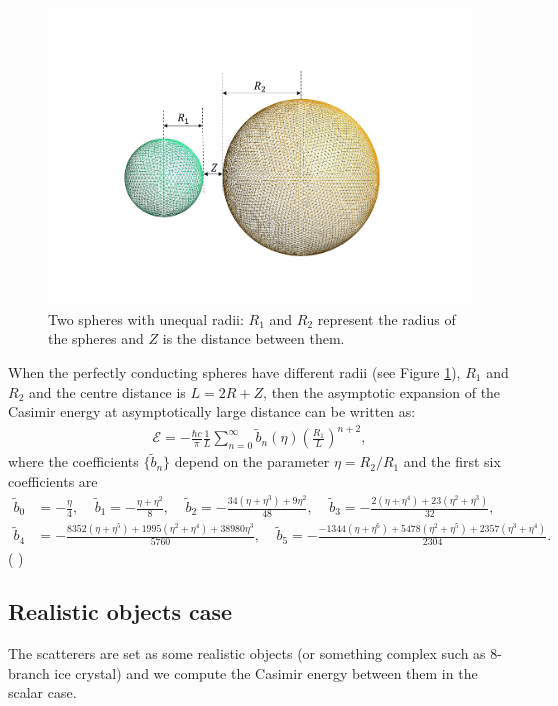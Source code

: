 \begin{figure}[H]
    \hspace*{2cm}\includegraphics[scale = 0.6]{figures/Grid_two_spheres_unequal_radii.png}
    \caption{Two spheres with unequal radii: $R_{1}$ and $R_{2}$ represent the radius of the spheres and $Z$ is the distance between them.}
    \label{Two spheres with unequal radii}
\end{figure}

When the perfectly conducting spheres have different radii (see Figure \ref{Two spheres with unequal radii}), $R_{1}$ and $R_{2}$ and the centre distance 
is $L = 2R+Z$, then the asymptotic expansion of the Casimir energy at asymptotically large distance can be written as:
\begin{align}\label{Asymptotic unequal radii}
    \mathcal{E} = -\frac{\hbar c}{\pi}\frac{1}{L}\sum_{n=0}^{\infty}\tilde{b}_{n}(\eta)\left(\frac{R_{1}}{L}\right)^{n+2},
\end{align}
where the coefficients $\{\tilde{b}_{n}\}$ depend on the parameter $\eta = R_{2}/R_{1}$ and the first six coefficients are
\begin{align*}
    \tilde{b}_{0} &= -\frac{\eta}{4}, \ \ \ \ \ \tilde{b}_{1} = -\frac{\eta + \eta^{2}}{8}, \ \ \ \ \  \tilde{b}_{2} = -\frac{34(\eta+\eta^{3})+ 9\eta^{2}}{48}, \ \ \ \ \ \tilde{b}_{3} = -\frac{2(\eta+\eta^{4}) + 23(\eta^{2} + \eta^{3})}{32}, \\ 
    \tilde{b}_{4} &= -\frac{8352(\eta + \eta^{5})+ 1995(\eta^{2} + \eta^{4}) + 38980\eta^{3}}{5760}, \ \ \ \ \ \tilde{b}_{5} = -\frac{-1344(\eta+\eta^{6}) + 5478(\eta^{2} + \eta^{5})+2357(\eta^{3} + \eta^{4})}{2304}.
\end{align*}
({\color {red}{Add relative distance figure for unequal radii case }} )

\subsection{Realistic objects case}
{\color {blue} The scatterers are set as some realistic objects (or something complex such as 8-branch ice crystal) and we compute the Casimir energy between them 
in the scalar case.} 
